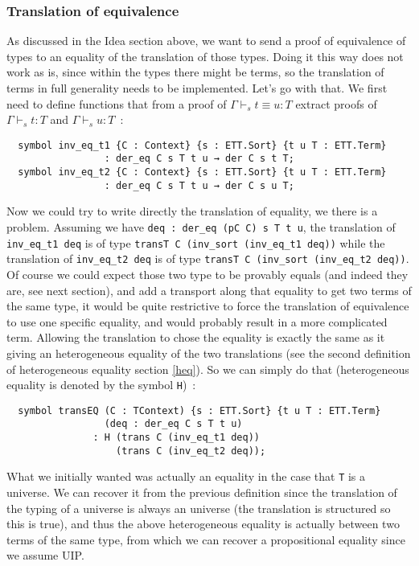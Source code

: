 \subsubsection{Translation of equivalence}\label{transEQ}

As discussed in the Idea section above, we want to send a proof of equivalence
of types to an equality of the translation of those types. Doing it this way
does not work as is, since within the types there might be terms, so the
translation of terms in full generality needs to be implemented. Let's go with
that. We first need to define functions that from a proof of $\Gamma\vdash_{s} t \equiv u : T$
extract proofs of $\Gamma\vdash_{s} t : T$ and $\Gamma\vdash_{s} u : T$~:

\begin{lstlisting}
  symbol inv_eq_t1 {C : Context} {s : ETT.Sort} {t u T : ETT.Term}
                 : der_eq C s T t u → der C s t T;
  symbol inv_eq_t2 {C : Context} {s : ETT.Sort} {t u T : ETT.Term}
                 : der_eq C s T t u → der C s u T;
\end{lstlisting}

Now we could try to write directly the translation of equality, we there is a
problem. Assuming we have \texttt{deq : der\_eq (pC C) s T t u}, the translation
of \texttt{inv\_eq\_t1 deq} is of type \texttt{transT C (inv\_sort (inv\_eq\_t1
deq))} while the translation of \texttt{inv\_eq\_t2 deq} is of type
\texttt{transT C (inv\_sort (inv\_eq\_t2 deq))}. Of course we could expect those
two type to be provably equals (and indeed they are, see next section), and add
a transport along that equality to get two terms of the same type, it would be
quite restrictive to force the translation of equivalence to use one specific
equality, and would probably result in a more complicated term. Allowing the
translation to chose the equality is exactly the same as it giving an
heterogeneous equality of the two translations (see the second definition of
heterogeneous equality section \ref{heq}). So we can simply do that
(heterogeneous equality is denoted by the symbol \texttt{H})~:

\begin{lstlisting}
  symbol transEQ (C : TContext) {s : ETT.Sort} {t u T : ETT.Term}
                 (deq : der_eq C s T t u)
               : H (trans C (inv_eq_t1 deq))
                   (trans C (inv_eq_t2 deq));
\end{lstlisting}

What we initially wanted was actually an equality in the case that \texttt{T} is
a universe. We can recover it from the previous definition since the translation
of the typing of a universe is always an universe (the translation is structured
so this is true), and thus the above heterogeneous equality is actually between
two terms of the same type, from which we can recover a propositional equality
since we assume UIP.

